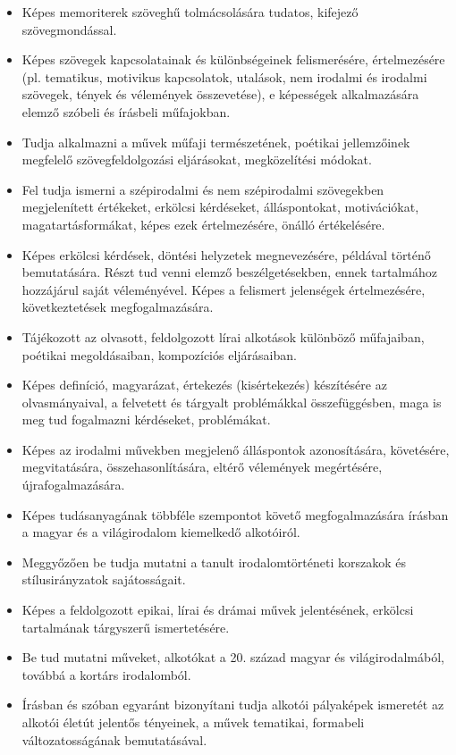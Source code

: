 \begin{itemize}
\item Képes memoriterek szöveghű tolmácsolására tudatos, kifejező szövegmondással.
\item Képes szövegek kapcsolatainak és különbségeinek felismerésére, értelmezésére (pl. tematikus, motivikus kapcsolatok, utalások, nem irodalmi és irodalmi szövegek, tények és vélemények összevetése), e képességek alkalmazására elemző szóbeli és írásbeli műfajokban.
\item Tudja alkalmazni a művek műfaji természetének, poétikai jellemzőinek megfelelő szövegfeldolgozási eljárásokat, megközelítési módokat.
\item Fel tudja ismerni a szépirodalmi és nem szépirodalmi szövegekben megjelenített értékeket, erkölcsi kérdéseket, álláspontokat, motivációkat, magatartásformákat, képes ezek értelmezésére, önálló értékelésére.
\item Képes erkölcsi kérdések, döntési helyzetek megnevezésére, példával történő bemutatására. Részt tud venni elemző beszélgetésekben, ennek tartalmához hozzájárul saját véleményével. Képes a felismert jelenségek értelmezésére, következtetések megfogalmazására.
\item Tájékozott az olvasott, feldolgozott lírai alkotások különböző műfajaiban, poétikai megoldásaiban, kompozíciós eljárásaiban.
\item Képes definíció, magyarázat, értekezés (kisértekezés) készítésére az olvasmányaival, a felvetett és tárgyalt problémákkal összefüggésben, maga is meg tud fogalmazni kérdéseket, problémákat.
\item Képes az irodalmi művekben megjelenő álláspontok azonosítására, követésére, megvitatására, összehasonlítására, eltérő vélemények megértésére, újrafogalmazására.
\item Képes tudásanyagának többféle szempontot követő megfogalmazására írásban a magyar és a világirodalom kiemelkedő alkotóiról.
\item Meggyőzően be tudja mutatni a tanult irodalomtörténeti korszakok és stílusirányzatok sajátosságait.
\item Képes a feldolgozott epikai, lírai és drámai művek jelentésének, erkölcsi tartalmának tárgyszerű ismertetésére.
\item Be tud mutatni műveket, alkotókat a 20. század magyar és világirodalmából, továbbá a kortárs irodalomból.
\item Írásban és szóban egyaránt bizonyítani tudja alkotói pályaképek ismeretét az alkotói életút jelentős tényeinek, a művek tematikai, formabeli változatosságának bemutatásával.

\end{itemize}
